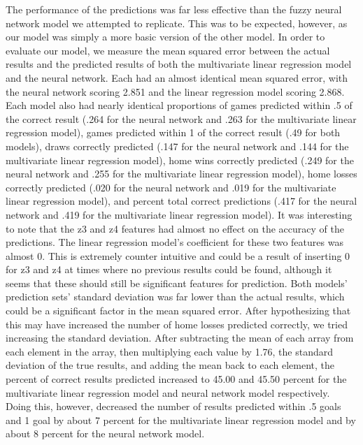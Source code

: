 \documentclass{article}
\begin{document}
The performance of the predictions was far less effective than the fuzzy neural network model we attempted to replicate. This was to be expected, however, as our model was simply a more basic version of the other model. In order to evaluate our model, we measure the mean squared error between the actual results and the predicted results of both the multivariate linear regression model and the neural network. Each had an almost identical mean squared error, with the neural network scoring 2.851 and the linear regression model scoring 2.868. Each model also had nearly identical proportions of games predicted within .5 of the correct result (.264 for the neural network and .263 for the multivariate linear regression model), games predicted within 1 of the correct result (.49 for both models), draws correctly predicted (.147 for the neural network and .144 for the multivariate linear regression model), home wins correctly predicted (.249 for the neural network and .255 for the multivariate linear regression model), home losses correctly predicted (.020 for the neural network and .019 for the multivariate linear regression model), and percent total correct predictions (.417 for the neural network and .419 for the multivariate linear regression model). It was interesting to note that the z3 and z4 features had almost no effect on the accuracy of the predictions. The linear regression model's coefficient for these two features was almost 0. This is extremely counter intuitive and could be a result of inserting 0 for z3 and z4 at times where no previous results could be found, although it seems that these should still be significant features for prediction. Both models' prediction sets' standard deviation was far lower than the actual results, which could be a significant factor in the mean squared error. After hypothesizing that this may have increased the number of home losses predicted correctly, we tried increasing the standard deviation. After subtracting the mean of each array from each element in the array, then multiplying each value by 1.76, the standard deviation of the true results, and adding the mean back to each element, the percent of correct results predicted increased to 45.00 and 45.50 percent for the multivariate linear regression model and neural network model respectively. Doing this, however, decreased the number of results predicted within .5 goals and 1 goal by about 7 percent for the multivariate linear regression model and by about 8 percent for the neural network model. 
\end{document}
